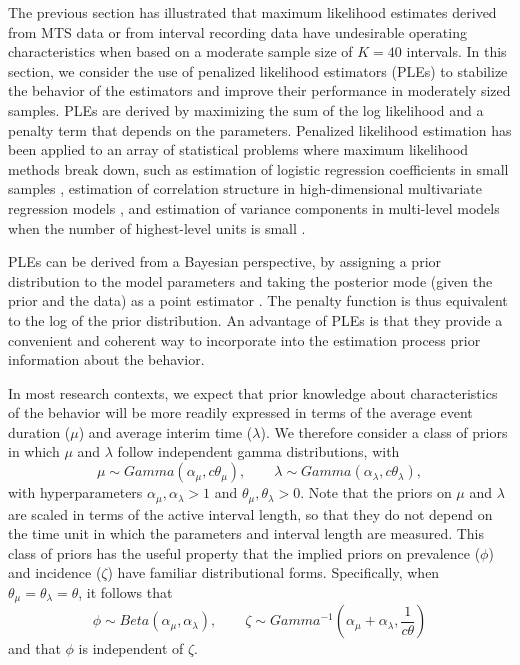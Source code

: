 \documentclass[man, noextraspace, floatsintext]{apa6}\usepackage[]{graphicx}\usepackage[]{color}
\begin{document}
The previous section has illustrated that maximum likelihood estimates derived from MTS data or from interval recording data have undesirable operating characteristics when based on a moderate sample size of $K = 40$ intervals. 
In this section, we consider the use of penalized likelihood estimators (PLEs) to stabilize the behavior of the estimators and improve their performance in moderately sized samples. 
PLEs are derived by maximizing the sum of the log likelihood and a penalty term that depends on the parameters. 
Penalized likelihood estimation has been applied to an array of statistical problems where maximum likelihood methods break down, such as estimation of logistic regression coefficients in small samples \citep{Galindo-Garre2004bayesian, Gelman2008weakly}, estimation of correlation structure in high-dimensional multivariate regression models \citep{Warton2008penalized}, and estimation of variance components in multi-level models when the number of highest-level units is small \citep{Chung2012non-degenerate}. 

PLEs can be derived from a Bayesian perspective, by assigning a prior distribution to the model parameters and taking the posterior mode (given the prior and the data) as a point estimator \citep{Chung2012non-degenerate}. 
The penalty function is thus equivalent to the log of the prior distribution. 
An advantage of PLEs is that they provide a convenient and coherent way to incorporate into the estimation process prior information about the behavior. 

In most research contexts, we expect that prior knowledge about characteristics of the behavior will be more readily expressed in terms of the average event duration ($\mu$) and average interim time ($\lambda$). 
We therefore consider a class of priors in which $\mu$ and $\lambda$ follow independent gamma distributions, with \[
\mu \sim Gamma\left(\alpha_\mu, c \theta_\mu\right), \qquad \lambda \sim Gamma\left(\alpha_\lambda, c \theta_\lambda\right), \]
with hyperparameters $\alpha_\mu, \alpha_\lambda > 1$ and $\theta_\mu, \theta_\lambda > 0$. 
Note that the priors on $\mu$ and $\lambda$ are scaled in terms of the active interval length, so that they do not depend on the time unit in which the parameters and interval length are measured. 
This class of priors has the useful property that the implied priors on prevalence ($\phi$) and incidence ($\zeta$) have familiar distributional forms. 
Specifically, when $\theta_\mu = \theta_\lambda = \theta$, it follows that \[
\phi \sim Beta\left(\alpha_\mu, \alpha_\lambda \right), \qquad \zeta \sim Gamma^{-1}\left(\alpha_\mu + \alpha_\lambda, \frac{1}{c\theta} \right) \]
and that $\phi$ is independent of $\zeta$. 
\end{document}
